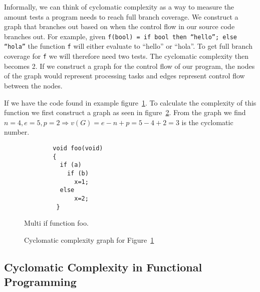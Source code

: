 Informally, we can think of cyclomatic complexity as a way to measure the amount
tests a program needs to reach full branch coverage. We construct a graph that
branches out based on when the control flow in our source code branches out. For
example, given \texttt{f(bool) = if bool then ``hello''; else ``hola''} the
function \texttt{f} will either evaluate to ``hello'' or ``hola''. To get full
branch coverage for \texttt{f} we will therefore need two tests. The cyclomatic
complexity then becomes 2. If we construct a graph for the control flow of our
program, the nodes of the graph would represent processing tasks and edges
represent control flow between the nodes. 

If we have the code found in example figure~\ref{c1excode}. To calculate the
complexity of this function we first construct a graph as seen in
figure~\ref{fig:c1exgraph}. From the graph we find $n=4, e=5, p=2\Rightarrow
v(G)=e-n+p=5-4+2=3$ is the cyclomatic number.

\begin{figure}[H]
    \begin{lstlisting}
        void foo(void)
        {
          if (a)
            if (b) 
              x=1;
          else
              x=2;
         }
    \end{lstlisting}
    \caption{Multi if function foo.}\label{c1excode}
\end{figure}


\begin{figure}[H]
    \centering
    \caption{Cyclomatic complexity graph for Figure~\ref{c1excode}}\label{fig:c1exgraph}
\end{figure}

\subsection{Cyclomatic Complexity in Functional
Programming}


